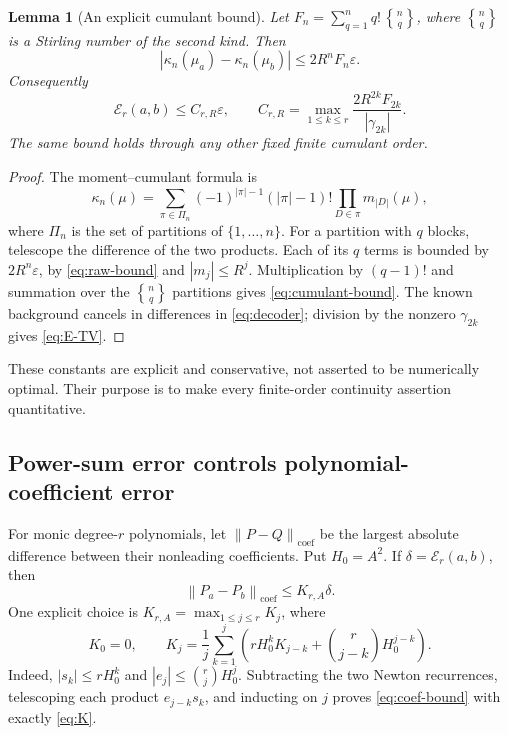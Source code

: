 \documentclass[11pt,a4paper]{article}
\numberwithin{equation}{section}
\newtheorem{lemma}[lemma]{Lemma}
\theoremstyle{definition}
\theoremstyle{remark}
\newcommand{\norm}[1]{\left\lVert#1\right\rVert}
\newcommand{\coef}{\operatorname{coef}}
\newcommand{\kap}{\kappa}
\newcommand{\stirling}[2]{\genfrac{\{}{\}}{0pt}{}{#1}{#2}}
\newcommand{\err}{\mathcal E_r}
\begin{document}
\begin{lemma}[An explicit cumulant bound]
\label{lem:cumulant-bound}
Let
$F_n=\sum_{q=1}^n q!\,\stirling{n}{q}$, where $\stirling{n}{q}$ is a Stirling number
of the second kind.  Then
\begin{equation}
 |\kap_n(\mu_a)-\kap_n(\mu_b)|
 \le2R^nF_n\varepsilon.
 \label{eq:cumulant-bound}
\end{equation}
Consequently
\begin{equation}
 \err(a,b)\le C_{r,R}\varepsilon,\qquad
 C_{r,R}=\max_{1\le k\le r}\frac{2R^{2k}F_{2k}}{|\gamma_{2k}|}.
 \label{eq:E-TV}
\end{equation}
The same bound holds through any other fixed finite cumulant order.
\end{lemma}
\begin{proof}
The moment--cumulant formula is
\[
 \kap_n(\mu)=\sum_{\pi\in\Pi_n}
 (-1)^{|\pi|-1}(|\pi|-1)!\prod_{D\in\pi}m_{|D|}(\mu),
\]
where $\Pi_n$ is the set of partitions of $\{1,\ldots,n\}$.
For a partition with $q$ blocks, telescope the difference of the two products.
Each of its $q$ terms is bounded by $2R^n\varepsilon$, by
\eqref{eq:raw-bound} and $|m_j|\le R^j$.  Multiplication by $(q-1)!$ and summation
over the $\stirling{n}{q}$ partitions gives \eqref{eq:cumulant-bound}.  The known
background cancels in differences in \eqref{eq:decoder}; division by the nonzero
$\gamma_{2k}$ gives \eqref{eq:E-TV}.
\end{proof}
These constants are explicit and conservative, not asserted to be numerically
optimal.  Their purpose is to make every finite-order continuity assertion
quantitative.

\subsection{Power-sum error controls polynomial-coefficient error}
For monic degree-$r$ polynomials, let $\norm{P-Q}_{\coef}$ be the largest absolute
difference between their nonleading coefficients.  Put $H_0=A^2$.
If $\delta=\err(a,b)$, then
\begin{equation}
 \norm{P_a-P_b}_{\coef}\le K_{r,A}\delta.
 \label{eq:coef-bound}
\end{equation}
One explicit choice is $K_{r,A}=\max_{1\le j\le r}K_j$, where
\begin{equation}
 K_0=0,\qquad
 K_j=\frac1j\sum_{k=1}^j
 \left(rH_0^kK_{j-k}+\binom r{j-k}H_0^{j-k}\right).
 \label{eq:K}
\end{equation}
Indeed, $|s_k|\le rH_0^k$ and $|e_j|\le\binom rjH_0^j$.  Subtracting the two
Newton recurrences, telescoping each product $e_{j-k}s_k$, and inducting on $j$
proves \eqref{eq:coef-bound} with exactly \eqref{eq:K}.
\end{document}
